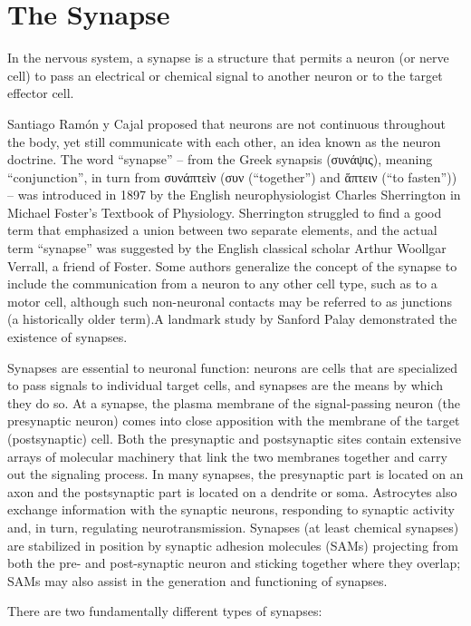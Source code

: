 \hypertarget{the-synapse}{%
\section{The Synapse}\label{the-synapse}}

In the nervous system, a synapse is a structure that permits a neuron (or nerve cell) to pass an electrical or chemical signal to another neuron or to the target effector cell.

Santiago Ramón y Cajal proposed that neurons are not continuous throughout the body, yet still communicate with each other, an idea known as the neuron doctrine. The word ``synapse'' -- from the Greek synapsis (συνάψις), meaning ``conjunction'', in turn from συνάπτεὶν (συν (``together'') and ἅπτειν (``to fasten'')) -- was introduced in 1897 by the English neurophysiologist Charles Sherrington in Michael Foster's Textbook of Physiology. Sherrington struggled to find a good term that emphasized a union between two separate elements, and the actual term ``synapse'' was suggested by the English classical scholar Arthur Woollgar Verrall, a friend of Foster. Some authors generalize the concept of the synapse to include the communication from a neuron to any other cell type, such as to a motor cell, although such non-neuronal contacts may be referred to as junctions (a historically older term).A landmark study by Sanford Palay demonstrated the existence of synapses.

Synapses are essential to neuronal function: neurons are cells that are specialized to pass signals to individual target cells, and synapses are the means by which they do so. At a synapse, the plasma membrane of the signal-passing neuron (the presynaptic neuron) comes into close apposition with the membrane of the target (postsynaptic) cell. Both the presynaptic and postsynaptic sites contain extensive arrays of molecular machinery that link the two membranes together and carry out the signaling process. In many synapses, the presynaptic part is located on an axon and the postsynaptic part is located on a dendrite or soma. Astrocytes also exchange information with the synaptic neurons, responding to synaptic activity and, in turn, regulating neurotransmission. Synapses (at least chemical synapses) are stabilized in position by synaptic adhesion molecules (SAMs) projecting from both the pre- and post-synaptic neuron and sticking together where they overlap; SAMs may also assist in the generation and functioning of synapses.

There are two fundamentally different types of synapses:

